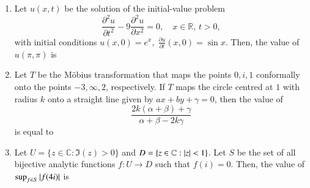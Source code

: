 \documentclass[journal,12pt,onecolumn]{IEEEtran}
\theoremstyle{remark}
\begin{document}
\begin{enumerate}
\item Let $u(x,t)$ be the solution of the initial-value problem  
$$
\frac{\partial^2 u}{\partial t^2} - 9\frac{\partial^2 u}{\partial x^2}=0, \quad x \in \mathbb{R}, \, t>0,
$$  
with initial conditions $u(x,0)=e^x, \; \tfrac{\partial u}{\partial t}(x,0)=\sin x$.  
Then, the value of $u(\pi,\pi)$ is  

\begin{enumerate}
\end{enumerate}
\hfill{}

\item Let $T$ be the Möbius transformation that maps the points $0,i,1$ conformally onto the points $-3,\infty,2$, respectively.  
If $T$ maps the circle centred at $1$ with radius $k$ onto a straight line given by $ax+by+\gamma=0$, then the value of  
$$
\frac{2k(\alpha+\beta)+\gamma}{\alpha+\beta-2k\gamma}
$$  
is equal to  

\begin{enumerate}
\end{enumerate}
\hfill{}

\item Let $U=\{z\in\mathbb{C}:\Im(z)>0\}$ and $D=\{z\in \mathbb{C}: \left\vert z\right\vert<1\}$.  
Let $S$ be the set of all bijective analytic functions $f:U\to D$ such that $f(i)=0$.  
Then, the value of $\sup_{f\in S}\left\vert f(4i)\right\vert$ is  

\begin{enumerate}
\end{enumerate}
\hfill{}


\end{enumerate}
\end{document}
